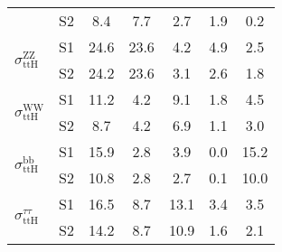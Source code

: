 \begin{tabular}{@{} l c c@{\hskip 0.15in} c c c c @{}}
                        & S2  & 8.4& 7.7 & 2.7 & 1.9 & 0.2  \\[4pt]
\multirow{2}{*}{$\sigma_{\mathrm{ttH}}^{\mathrm{ZZ}}$} & S1  & 24.6& 23.6 & 4.2 & 4.9 & 2.5  \\[1pt]
                        & S2  & 24.2& 23.6 & 3.1 & 2.6 & 1.8  \\[4pt]
\multirow{2}{*}{$\sigma_{\mathrm{ttH}}^{\mathrm{WW}}$} & S1  & 11.2& 4.2 & 9.1 & 1.8 & 4.5  \\[1pt]
                        & S2  & 8.7& 4.2 & 6.9 & 1.1 & 3.0  \\[4pt]
\multirow{2}{*}{$\sigma_{\mathrm{ttH}}^{\mathrm{bb}}$} & S1  & 15.9& 2.8 & 3.9 & 0.0 & 15.2  \\[1pt]
                        & S2  & 10.8& 2.8 & 2.7 & 0.1 & 10.0  \\[4pt]
\multirow{2}{*}{$\sigma_{\mathrm{ttH}}^{\tau \tau }$} & S1  & 16.5& 8.7 & 13.1 & 3.4 & 3.5  \\[1pt]
                        & S2  & 14.2& 8.7 & 10.9 & 1.6 & 2.1  \\[4pt]
\hline
\end{tabular}